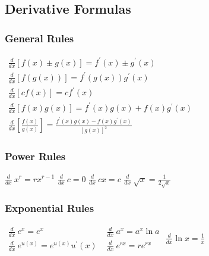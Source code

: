 \documentclass[10pt,letterpaper]{article}
\begin{document}
\pagebreak\begin{multicols}{2}								\subsection*{Derivative Formulas}
															\subsubsection*{General Rules}

\begin{center} $ \begin{array}{l}
   \frac{d}{dx} \left[ f(x) \pm g(x) \right] = f ^\prime (x) \pm g ^\prime (x) \\
   \frac{d}{dx} \left[ f \left( g(x) \right) \right] = f ^\prime  \left( g(x) \right) g ^\prime (x) \\
   \frac{d}{dx} \left[ cf(x) \right] = cf ^\prime (x) \\
   \frac{d}{dx} \left[ f(x)g(x) \right] = f ^\prime (x)g(x) + f(x)g ^\prime (x) \\
   \frac{d}{dx} \left[ \frac{f(x)}{g(x)} \right] = \frac{f ^\prime (x)g(x)-f(x)g ^\prime (x)}{ \left[ g(x) \right] ^{2}}
  \end{array} $ \end{center}		
															\subsubsection*{Power Rules}

$ \frac{d}{dx}\: x^{r} = rx^{r - 1} $ \hfill
$ \frac{d}{dx}\: c = 0 $ \hfill
$ \frac{d}{dx}\: cx = c $ \hfill
$ \frac{d}{dx}\: \sqrt{x} = \frac{1}{2 \sqrt{x} } $

															\subsubsection*{Exponential Rules}

$ \begin{array}{ll}
   \frac{d}{dx}\: e^{x} = e^{x} \\
   \frac{d}{dx}\: e^{u(x)} = e^{u(x)}u ^\prime (x)
  \end{array} $ \hfill
$ \begin{array}{ll}
   \frac{d}{dx}\: a^{x} = a^{x} \ln a \\
   \frac{d}{dx}\: e^{rx} = re^{rx}
  \end{array} $ \hfill
$ \frac{d}{dx} \ln x = \frac{1}{x} $


\end{multicols}
\end{document}
